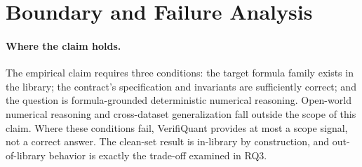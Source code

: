 \documentclass[sigconf,anonymous]{acmart}
\begin{document}
\section{Boundary and Failure Analysis}\label{sec:v2boundary}

\paragraph{Where the claim holds.}
The empirical claim requires three conditions: the target formula family exists in the library; the contract's specification and invariants are sufficiently correct; and the question is formula-grounded deterministic numerical reasoning.
Open-world numerical reasoning and cross-dataset generalization fall outside the scope of this claim.
Where these conditions fail, VerifiQuant provides at most a scope signal, not a correct answer.
The clean-set result is in-library by construction, and out-of-library behavior is exactly the trade-off examined in RQ3.
\end{document}
